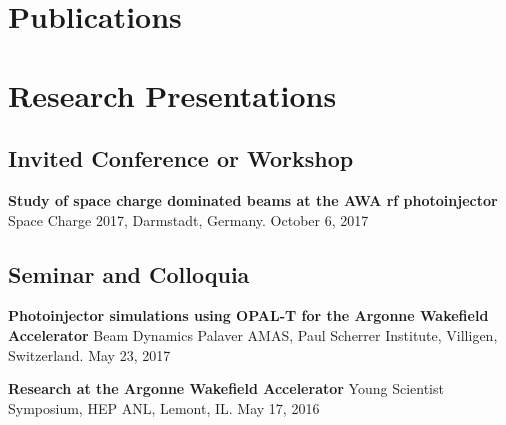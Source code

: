 \documentclass[11pt,a4paper,sans]{moderncv}        %
\begin{document}
\section{Publications}
%




\section{Research Presentations}

\subsection{Invited Conference or Workshop} %
\textbf{Study of space charge dominated beams at the AWA rf photoinjector}\newline
Space Charge 2017, Darmstadt, Germany. October 6, 2017

\subsection{Seminar and Colloquia}
\textbf{Photoinjector simulations using OPAL-T for the Argonne Wakefield Accelerator}\newline
Beam Dynamics Palaver AMAS, Paul Scherrer Institute, Villigen, Switzerland. May 23, 2017 
\vspace{0.3em}

\textbf{Research at the Argonne Wakefield Accelerator}\newline
Young Scientist Symposium, HEP ANL, Lemont, IL. May 17, 2016 
\vspace{0.3em}
\end{document}
